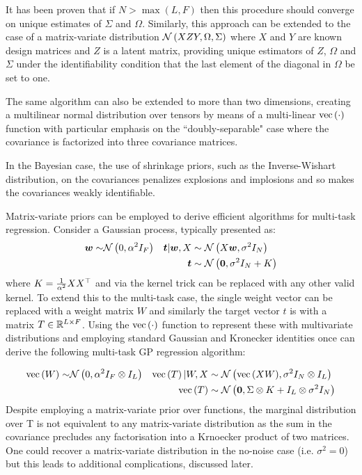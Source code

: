 It has been proven that if $N > \max(L, F)$ then this procedure should converge on unique estimates of $\Sigma$ and $\Omega$\cite{Srivastava2009}. Similarly, this approach can be extended\cite{Srivastava2009a} to the case of a matrix-variate distribution $\mathcal{N} \left(XZY, \Omega, \Sigma\right)$ where $X$ and $Y$ are known design matrices and $Z$ is a latent matrix, providing unique estimators of $Z$, $\Omega$ and $\Sigma$ under the identifiability condition that the last element of the diagonal in $\Omega$ be set to one.


The same algorithm can also be extended to more than two dimensions\cite{Ohlson2011}\cite{Ohlson2013}, creating a multilinear normal distribution over tensors by means of a multi-linear $\text{vec}\left(\cdot\right)$ function with particular emphasis on the ``doubly-separable" case where the covariance is factorized into three covariance matrices.

In the Bayesian case, the use of shrinkage priors, such as the Inverse-Wishart distribution, on the covariances penalizes explosions and implosions\cite{Archambeau2011} and so makes the covariances weakly identifiable.

Matrix-variate priors can be employed to derive efficient algorithms for multi-task regression. Consider a Gaussian process, typically\cite{Bishop2006} presented as:
\begin{align}
\bm w \sim & \mathcal{N} \left( {0}, {\alpha^2 I_F} \right) & \bm t|\bm w,X & \sim \mathcal{N} \left( {X\bm w}, {\sigma^2 I_N} \right) \\
& & \bm t & \sim \mathcal{N} \left( {\bm 0}, {\sigma^2I_N + K} \right)
\end{align}
where $K = \frac{1}{\alpha^2} X X^\top$ and via the kernel trick\cite{Jst2004} can be replaced with any other valid kernel. To extend this to the multi-task case, the single weight vector can be replaced with a weight matrix $W$ and similarly the target vector $t$ is with a matrix $T \in { \mathbb{R}^{L \times F} }$. Using the $\text{vec}\left(\cdot\right)$ function to represent these with multivariate distributions and employing standard Gaussian\cite{Bishop2006} and Kronecker\cite{Minka2000a} identities once can derive the following multi-task GP regression algorithm\cite{Bonilla2008}:

\begin{align}
\text{vec}\left(W\right) \sim & \mathcal{N} \left( {0}, {\alpha^2 I_F \otimes I_L} \right) & 
\text{vec}\left(T\right)|W,X & \sim \mathcal{N} \left( {\text{vec}\left(XW\right)}, {\sigma^2 I_N \otimes I_L} \right) \\
& & \text{vec}\left(T\right) & \sim \mathcal{N} \left( {\bm 0}, {\Sigma \otimes K + I_L \otimes \sigma^2I_N} \right)
\end{align}
Despite employing a matrix-variate prior over functions, the marginal distribution over T is not equivalent to any matrix-variate distribution as the sum in the covariance precludes any factorisation into a Krnoecker product of two matrices. One could recover a matrix-variate distribution in the no-noise case (i.e. $\sigma^2 = 0$) but this leads to additional complications, discussed later.

